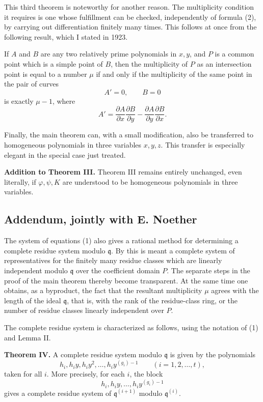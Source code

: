 \documentclass[12pt]{article}
\begin{document}
This third theorem is noteworthy for another reason. The multiplicity condition it requires is one whose fulfillment can be checked, independently of formula (2), by carrying out differentiation finitely many times. This follows at once from the following result, which I stated in 1923.

If \(A\) and \(B\) are any two relatively prime polynomials in \(x,y\), and \(P\) is a common point which is a simple point of \(B\), then the multiplicity of \(P\) as an intersection point is equal to a number \(\mu\) if and only if the multiplicity of the same point in the pair of curves
\[
  A'=0,
  \qquad
  B=0
\]
is exactly \(\mu-1\), where
\[
  A'=\frac{\partial A}{\partial x}\frac{\partial B}{\partial y}
     -
     \frac{\partial A}{\partial y}\frac{\partial B}{\partial x}.
\]

Finally, the main theorem can, with a small modification, also be transferred to homogeneous polynomials in three variables \(x,y,z\). This transfer is especially elegant in the special case just treated.

\textbf{Addition to Theorem III.} Theorem III remains entirely unchanged, even literally, if \(\varphi,\psi,K\) are understood to be homogeneous polynomials in three variables.

\subsection{Addendum, jointly with E. Noether}

The system of equations (1) also gives a rational method for determining a complete residue system modulo \(\mathfrak q\). By this is meant a complete system of representatives for the finitely many residue classes which are linearly independent modulo \(\mathfrak q\) over the coefficient domain \(P\). The separate steps in the proof of the main theorem thereby become transparent. At the same time one obtains, as a byproduct, the fact that the resultant multiplicity \(\mu\) agrees with the length of the ideal \(\mathfrak q\), that is, with the rank of the residue-class ring, or the number of residue classes linearly independent over \(P\).

The complete residue system is characterized as follows, using the notation of (1) and Lemma II.

\textbf{Theorem IV.} A complete residue system modulo \(\mathfrak q\) is given by the polynomials
\[
  h_i,
  h_i y,
  h_i y^2,
  \ldots,
  h_i y^{(g_i)-1}
  \qquad (i=1,2,\ldots,t),
\]
taken for all \(i\). More precisely, for each \(i\), the block
\[
  h_i,
  h_i y,
  \ldots,
  h_i y^{(g_i)-1}
\]
gives a complete residue system of \(\mathfrak q^{(i+1)}\) modulo \(\mathfrak q^{(i)}\).
\end{document}
